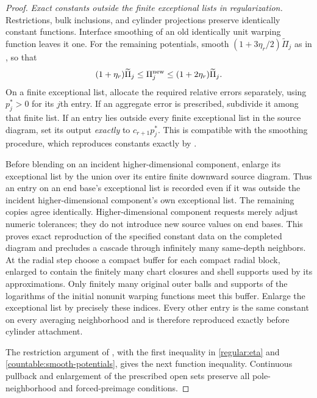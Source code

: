 \begin{proof}
\emph{Exact constants outside the finite exceptional lists in regularization.}
Restrictions, bulk inclusions, and cylinder projections preserve
identically constant functions. Interface smoothing of an old identically
unit warping function leaves it one. For the remaining potentials, smooth
$(1+3\eta_r/2)\widetilde\Pi_j$ as in
, so that
\begin{equation}\label{countable:smooth-potentials}
 (1+\eta_r)\widetilde\Pi_j\le\Pi_j^{\rm new}
                     \le(1+2\eta_r)\widetilde\Pi_j.
\end{equation}
On a finite exceptional list, allocate the required relative errors
separately, using $p_j^*>0$ for its $j$th entry. If an aggregate error
is prescribed, subdivide it among that finite list. If an entry lies outside every finite exceptional list in the source
diagram, set its output \emph{exactly} to
$c_{r+1}p_j^*$. This is compatible with the smoothing procedure, which
reproduces constants exactly by .

Before blending on an incident higher-dimensional component, enlarge its exceptional list by the union
over its entire finite downward source diagram. Thus an entry on an end base's exceptional list is recorded even if it
was outside the incident higher-dimensional component's own exceptional list.
The remaining copies agree identically. Higher-dimensional component requests merely adjust
numeric tolerances; they do not introduce new source values on end bases.
This proves exact reproduction of the specified constant data on the completed diagram and
precludes a cascade through infinitely many same-depth neighbors.
At the radial step choose a compact buffer for each compact radial
block, enlarged to contain the finitely many chart closures and shell
supports used by its approximations. Only finitely many original
outer balls and supports of the logarithms of the initial nonunit warping functions meet this buffer.
Enlarge the exceptional list by precisely these indices. Every other
entry is the same constant on every averaging neighborhood and is
therefore reproduced exactly before cylinder attachment.

The restriction argument of , with the first
inequality in \eqref{regular:eta} and \eqref{countable:smooth-potentials},
gives the next function inequality.
Continuous pullback and enlargement of the prescribed open sets preserve all pole-neighborhood
and forced-preimage conditions.


\end{proof}

